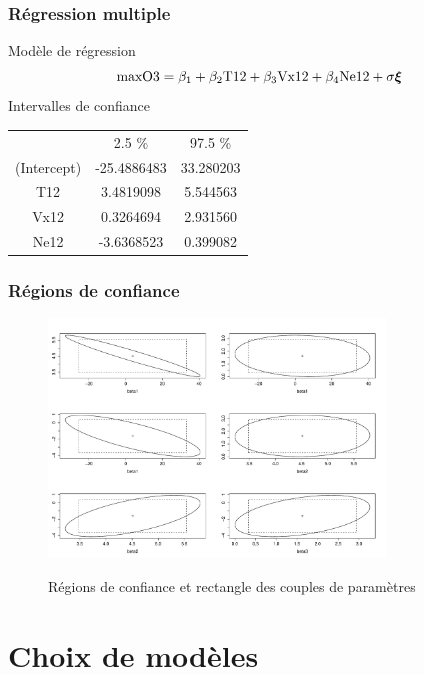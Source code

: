 \begin{frame}
\frametitle{Régression multiple}
\alert{Modèle de régression}
\[
\mathrm{maxO3}= \beta_1 + \beta_2 \mathrm{T12} + \beta_3 \mathrm{Vx12} + \beta_4 \mathrm{Ne12} + \sigma \boldsymbol{\xi}
\]
\alert{Intervalles de confiance}
\begin{table}
\begin{tabular}{ccc}
            &      2.5 \% &   97.5 \% \\
(Intercept) &-25.4886483  & 33.280203 \\
T12         &  3.4819098  & 5.544563  \\
Vx12        &  0.3264694  & 2.931560  \\
Ne12        & -3.6368523  & 0.399082
\end{tabular}
\end{table}
\end{frame}

\begin{frame}
\frametitle{Régions de confiance}
\begin{figure}
  \centering
  \includegraphics[width=0.8\textwidth]{Rconfiance}\\
  \caption{Régions de confiance et rectangle des couples de paramètres}
\end{figure}
\end{frame}

\section{Choix de modèles}

